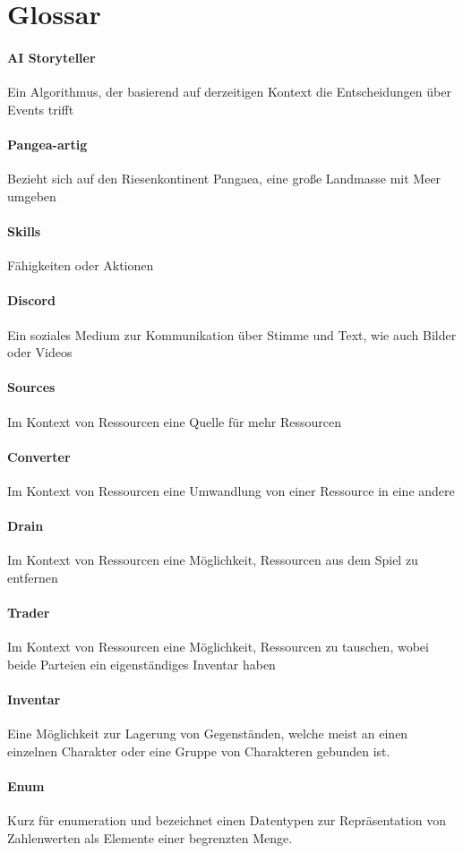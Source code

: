 \newpage
\section*{Glossar}
\paragraph*{AI Storyteller} Ein Algorithmus, der basierend auf derzeitigen Kontext die Entscheidungen über Events trifft
\paragraph*{Pangea-artig} Bezieht sich auf den Riesenkontinent Pangaea, eine große Landmasse mit Meer umgeben
\paragraph*{Skills} Fähigkeiten oder Aktionen
\paragraph*{Discord} Ein soziales Medium zur Kommunikation über Stimme und Text, wie auch Bilder oder Videos
\paragraph*{Sources} Im Kontext von Ressourcen eine Quelle für mehr Ressourcen
\paragraph*{Converter} Im Kontext von Ressourcen eine Umwandlung von einer Ressource in eine andere
\paragraph*{Drain} Im Kontext von Ressourcen eine Möglichkeit, Ressourcen aus dem Spiel zu entfernen
\paragraph*{Trader} Im Kontext von Ressourcen eine Möglichkeit, Ressourcen zu tauschen, wobei beide Parteien ein eigenständiges Inventar haben
\paragraph*{Inventar} Eine Möglichkeit zur Lagerung von Gegenständen, welche meist an einen einzelnen Charakter oder eine Gruppe von Charakteren gebunden ist.
\paragraph*{Enum} Kurz für \glqq enumeration\grqq\; und bezeichnet einen Datentypen zur Repräsentation von Zahlenwerten als Elemente einer begrenzten Menge.
